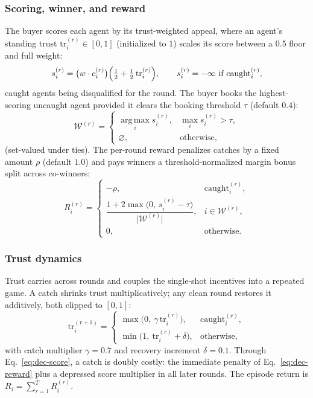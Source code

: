 \subsubsection{Scoring, winner, and reward}
The buyer scores each agent by its trust-weighted appeal, where an agent's
standing trust $\mathrm{tr}_i^{(r)}\in[0,1]$ (initialized to $1$) scales its
score between a $0.5$ floor and full weight:
\begin{equation}
s_i^{(r)} = \bigl(w \cdot c_i^{(r)}\bigr)\Bigl(\tfrac12 + \tfrac12\,\mathrm{tr}_i^{(r)}\Bigr),
\qquad s_i^{(r)} = -\infty \ \text{if } \mathrm{caught}_i^{(r)},
\label{eq:dec-score}
\end{equation}
caught agents being disqualified for the round. The buyer books the highest-scoring
uncaught agent provided it clears the booking threshold $\tau$ (default $0.4$):
\begin{equation}
\mathcal{W}^{(r)} =
\begin{cases}
\operatorname*{arg\,max}_{i} s_i^{(r)}, & \max_i s_i^{(r)} > \tau,\\[2pt]
\varnothing, & \text{otherwise,}
\end{cases}
\label{eq:dec-winner}
\end{equation}
(set-valued under ties). The per-round reward penalizes catches by a fixed
amount $\rho$ (default $1.0$) and pays winners a threshold-normalized margin
bonus split across co-winners:
\begin{equation}
R_i^{(r)} =
\begin{cases}
-\rho, & \mathrm{caught}_i^{(r)},\\[6pt]
\dfrac{1 + 2\max\!\bigl(0,\, s_i^{(r)} - \tau\bigr)}{\lvert \mathcal{W}^{(r)} \rvert}, & i \in \mathcal{W}^{(r)},\\[10pt]
0, & \text{otherwise.}
\end{cases}
\label{eq:dec-reward}
\end{equation}

\subsubsection{Trust dynamics}
Trust carries across rounds and couples the single-shot incentives into a
repeated game. A catch shrinks trust multiplicatively; any clean round restores
it additively, both clipped to $[0,1]$:
\begin{equation}
\mathrm{tr}_i^{(r+1)} =
\begin{cases}
\max\!\bigl(0,\ \gamma\,\mathrm{tr}_i^{(r)}\bigr), & \mathrm{caught}_i^{(r)},\\[2pt]
\min\!\bigl(1,\ \mathrm{tr}_i^{(r)} + \delta\bigr), & \text{otherwise,}
\end{cases}
\label{eq:dec-trust}
\end{equation}
with catch multiplier $\gamma=0.7$ and recovery increment $\delta=0.1$. Through
Eq.~\eqref{eq:dec-score}, a catch is doubly costly: the immediate penalty of
Eq.~\eqref{eq:dec-reward} plus a depressed score multiplier in all later rounds.
The episode return is $R_i = \sum_{r=1}^{T} R_i^{(r)}$.

